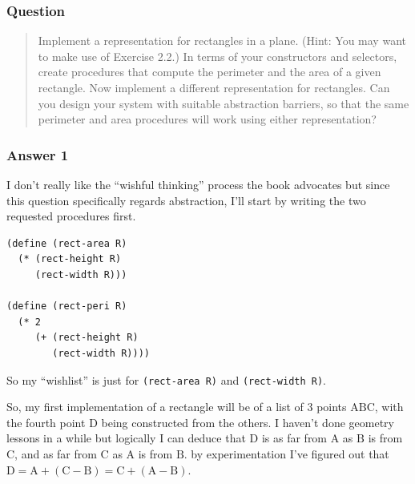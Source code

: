 \documentclass[final,fleqn,titlepage,twoside]{article}
\begin{document}
\subsubsection{Question}
\label{sec:org1a538b1}
\begin{quote}
Implement a representation for rectangles in a plane. (Hint: You may want to
make use of Exercise 2.2.) In terms of your constructors and selectors, create
procedures that compute the perimeter and the area of a given rectangle. Now
implement a different representation for rectangles. Can you design your system
with suitable abstraction barriers, so that the same perimeter and area
procedures will work using either representation?
\end{quote}

\subsubsection{Answer 1}
\label{sec:org3a6f080}
I don't really like the ``wishful thinking'' process the book advocates but since
this question specifically regards abstraction, I'll start by writing the two
requested procedures first.

\begin{verbatim}
(define (rect-area R)
  (* (rect-height R)
     (rect-width R)))

(define (rect-peri R)
  (* 2
     (+ (rect-height R)
        (rect-width R))))
\end{verbatim}

So my ``wishlist'' is just for \texttt{(rect-area R)} and \texttt{(rect-width R)}.

So, my first implementation of a rectangle will be of a list of 3 points
\(\mathrm{ABC}\), with the fourth point \(\mathrm{D}\) being constructed from
the others. I haven't done geometry lessons in a while but logically I can
deduce that \(\mathrm{D}\) is as far from \(\mathrm{A}\) as \(\mathrm{B}\) is
from \(\mathrm{C}\), and as far from \(\mathrm{C}\) as \(\mathrm{A}\) is from
\(\mathrm{B}\). by experimentation I've figured out that
\(\mathrm{D}=\mathrm{A} + (\mathrm{C}-\mathrm{B})=\mathrm{C} +
(\mathrm{A}-\mathrm{B})\).
\end{document}
